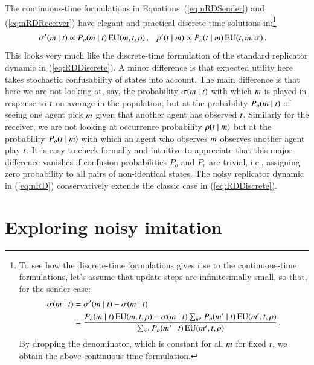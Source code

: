 \documentclass[fleqn,reqno,10pt]{article}
\begin{document}
The continuous-time formulations in Equations~(\ref{eq:nRDSender}) and (\ref{eq:nRDReceiver})
have elegant and practical discrete-time solutions in:\footnote{To see how the discrete-time
  formulations gives rise to the continuous-time formulations, let's assume that update steps are
  infinitesimally small, so that, for the sender case:
  \begin{align*}
    \dot{\sigma}(m \mid t) & = \sigma'(m \mid t) - \sigma(m
    \mid t)\\ 
    &= \frac{P_o(m \mid t) \thinspace \mathrm{EU}(m, t, \rho)
      - \sigma(m \mid t) \sum_{m'} P_o(m' \mid t) \thinspace
      \mathrm{EU}(m', t, \rho) }{ \sum_{m'} P_o(m' \mid t) \thinspace
      \mathrm{EU}(m', t, \rho)}\,.
  \end{align*}
By dropping the denominator, which is constant for all $m$ for fixed
$t$, we obtain the above continuous-time formulation.}
\begin{align}
  \label{eq:nRD}
  \sigma'(m \mid t) & \propto P_o(m \mid t) \thinspace \mathrm{EU}(m,
  t, \rho)\,, & \rho'(t \mid m) & \propto P_o(t \mid m)
  \thinspace \mathrm{EU}(t, m, \sigma)\,.
\end{align}
This looks very much like the discrete-time formulation of the standard replicator dynamic in
(\ref{eq:RDDiscrete}). A minor difference is that expected utility here takes stochastic
confusability of states into account. The main difference is that here we are not looking at,
say, the probability $\sigma(m \mid t)$ with which $m$ is played in
response to $t$ on average in the population, but at the probability $P_o(m \mid
t)$ of seeing one agent pick $m$ given that another agent has observed
$t$. Similarly for the receiver, we are not looking at occurrence probability
$\rho(t \mid m)$ but at the probability $P_o(t \mid m)$ with
which an agent who observes $m$ observes another agent play $t$. It is easy to check
formally and intuitive to appreciate that this major difference vanishes if confusion
probabilities $P_o$ and $P_r$ are trivial, i.e., assigning zero probability to all pairs of
non-identical states. The noisy replicator dynamic in (\ref{eq:nRD}) conservatively extends the
classic case in (\ref{eq:RDDiscrete}). 


\section{Exploring noisy imitation}
\label{sec:exploring-rdd}
\end{document}
